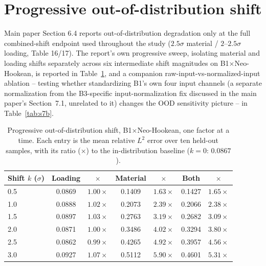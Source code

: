 \documentclass[11pt]{article}
\begin{document}
\FloatBarrier
\section{Progressive out-of-distribution shift}
\label{sec:s7}
Main paper Section 6.4 reports out-of-distribution degradation only at
the full combined-shift endpoint used throughout the study
($2.5\sigma$ material / $2$--$2.5\sigma$ loading, Table 16/17). The report's
own progressive sweep, isolating material and loading shifts separately
across six intermediate shift magnitudes on B1$\times$Neo-Hookean, is
reported in Table~\ref{tab:s7a}, and a companion raw-input-vs-normalized-input
ablation -- testing whether standardizing B1's own four input channels
(a separate normalization from the B3-specific input-normalization fix
discussed in the main paper's Section~7.1, unrelated to it) changes the
OOD sensitivity picture -- in Table~\ref{tab:s7b}.

\begin{table}[h]
\centering
\caption{Progressive out-of-distribution shift, B1$\times$Neo-Hookean,
  one factor at a time. Each entry is the mean relative $L^2$ error over
  ten held-out samples, with its ratio ($\times$) to the in-distribution
  baseline ($k{=}0$: $0.0867$).}
\label{tab:s7a}
\small
\begin{tabular}{lcccccc}
\toprule
Shift $k$ ($\sigma$) & Loading & $\times$ & Material & $\times$ & Both & $\times$ \\
\midrule
0.5 & 0.0869 & $1.00\times$ & 0.1409 & $1.63\times$ & 0.1427 & $1.65\times$ \\
1.0 & 0.0888 & $1.02\times$ & 0.2073 & $2.39\times$ & 0.2066 & $2.38\times$ \\
1.5 & 0.0897 & $1.03\times$ & 0.2763 & $3.19\times$ & 0.2682 & $3.09\times$ \\
2.0 & 0.0871 & $1.00\times$ & 0.3486 & $4.02\times$ & 0.3294 & $3.80\times$ \\
2.5 & 0.0862 & $0.99\times$ & 0.4265 & $4.92\times$ & 0.3957 & $4.56\times$ \\
3.0 & 0.0927 & $1.07\times$ & 0.5112 & $5.90\times$ & 0.4601 & $5.31\times$ \\
\bottomrule
\end{tabular}
\end{table}
\end{document}
